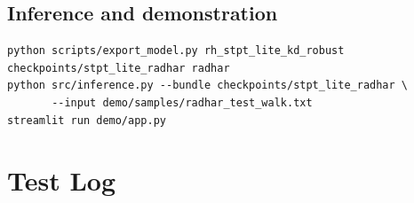\section{Inference and demonstration}
\begin{lstlisting}[numbers=none]
python scripts/export_model.py rh_stpt_lite_kd_robust checkpoints/stpt_lite_radhar radhar
python src/inference.py --bundle checkpoints/stpt_lite_radhar \
       --input demo/samples/radhar_test_walk.txt
streamlit run demo/app.py
\end{lstlisting}

\chapter{Test Log}


